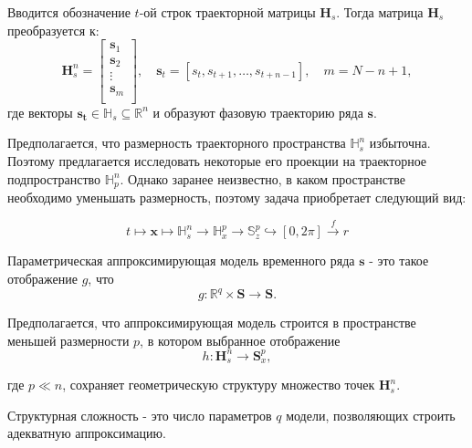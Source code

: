 \documentclass[12pt,twoside]{article}
\begin{document}
Вводится обозначение $t$-ой строк траекторной матрицы $\mathbf{H}_{s}$. Тогда матрица $\mathbf{H}_{s}$ преобразуется к:	
\begin{equation}
	\mathbf{H}_{s}^{n} = 
	\begin{bmatrix} 
      	\mathbf{s}_{1}\\
      	\mathbf{s}_{2}\\
      	\vdots\\
      	\mathbf{s}_{m}\\
   \end{bmatrix},
   \quad
   \mathbf{s}_t=[s_{t},s_{t+1},\ldots,s_{t+n-1}],
   \quad
   m = N-n+1,
\label{eq:hankel_matrix_2}
\end{equation}
\vspace{\baselineskip}
где векторы $\mathbf{s_{t}} \in \mathbb{H}_{s} \subseteq \mathbb{R}^{n}$ и образуют фазовую траекторию ряда $\mathbf{s}$.

Предполагается, что размерность траекторного пространства $\mathbb{H}_{s}^{n}$ избыточна.
Поэтому предлагается исследовать некоторые его проекции на траекторное подпространство $\mathbb{H}_{p}^{n}$.
Однако заранее неизвестно, в каком пространстве необходимо уменьшать размерность, поэтому задача приобретает следующий вид:

\begin{equation}
	t
	\mapsto
	\mathbf{x}
	\mapsto
	\mathbb{H}_{s}^{n}
	\xrightarrow{}
	\mathbb{H}_{x}^{p}
	\xrightarrow{}
	\mathbb{S}_z^{p}
	\hookrightarrow
	[0,2\pi]
	\xrightarrow{f}
	r
\label{eq:goal}
\end{equation}

\vspace{\baselineskip}

\begin{Def}
Параметрическая аппроксимирующая модель временного ряда  $\mathbf{s}$  - это такое отображение $g$, что
\begin{equation}
	g: \mathbb{R}^{q} \times \mathbf{S} \xrightarrow{} \mathbf{S}.
\label{eq:param_model}
\end{equation}
\end{Def}

Предполагается, что аппроксимирующая модель строится в пространстве меньшей размерности $p$, в котором выбранное отображение
\begin{equation}
h: \mathbf{H}_{s}^{n} \xrightarrow{} \mathbf{S}_x^{p},
\label{eq:tomindimmodel}
\end{equation}

где $p \ll n$, сохраняет геометрическую структуру множество точек $\mathbf{H}_{s}^{n}$. 
\begin{Def}
Структурная сложность - это число параметров $q$ модели, позволяющих строить адекватную аппроксимацию.
\end{Def}
\end{document}
